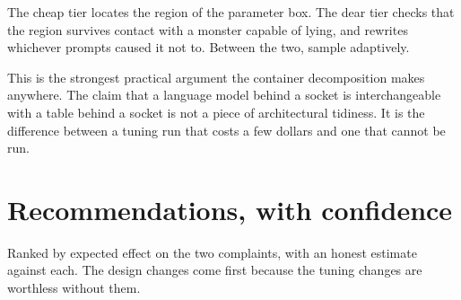 \documentclass[11pt,a4paper]{article}
\begin{document}
The cheap tier locates the region of the parameter box. The dear tier checks that the region
survives contact with a monster capable of lying, and rewrites whichever prompts caused it not
to. Between the two, sample adaptively.

\begin{sectionbox}
This is the strongest practical argument the container decomposition makes anywhere. The claim
that a language model behind a socket is interchangeable with a table behind a socket is not a
piece of architectural tidiness. It is the difference between a tuning run that costs a few
dollars and one that cannot be run.
\end{sectionbox}

\newpage

\section{Recommendations, with confidence}

Ranked by expected effect on the two complaints, with an honest estimate against each. The design
changes come first because the tuning changes are worthless without them.
\end{document}
